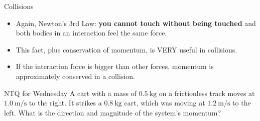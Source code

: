 \documentclass[english]{beamer}
\begin{document}
\begin{frame}{Collisions}
  \begin{itemize}
    \item Again, Newton's 3rd Law: \textbf{you cannot touch without being touched} and both bodies in an interaction feel the same force.
    \item This fact, plus conservation of momentum, is VERY useful in collisions.
    \item If the interaction force is bigger than other forces, momentum is approximately conserved in a collision.
  \end{itemize}
\end{frame}

\begin{frame}{NTQ for Wednesday}
  A cart with a mass of $\SI{0.5}{\kilogram}$ on a frictionless track moves at $\SI{1.0}{\meter\per\second}$ to the right. It strikes a $\SI{0.8}{\kilogram}$ cart, which was moving at $\SI{1.2}{\meter\per\second}$ to the left. What is the direction and magnitude of the system's momentum?
\end{frame}
\end{document}
